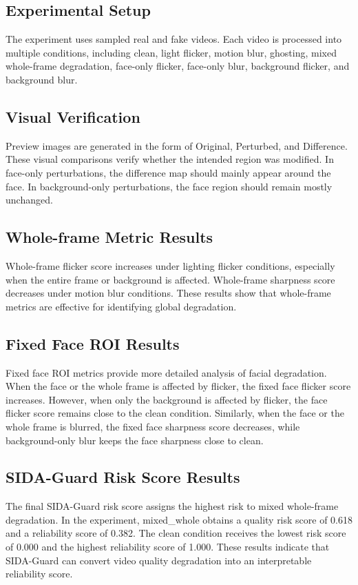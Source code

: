 \documentclass[conference]{IEEEtran}
\begin{document}
\subsection{Experimental Setup}
The experiment uses sampled real and fake videos. Each video is processed into multiple conditions, including clean, light flicker, motion blur, ghosting, mixed whole-frame degradation, face-only flicker, face-only blur, background flicker, and background blur.

\subsection{Visual Verification}
Preview images are generated in the form of Original, Perturbed, and Difference. These visual comparisons verify whether the intended region was modified. In face-only perturbations, the difference map should mainly appear around the face. In background-only perturbations, the face region should remain mostly unchanged.

\subsection{Whole-frame Metric Results}
Whole-frame flicker score increases under lighting flicker conditions, especially when the entire frame or background is affected. Whole-frame sharpness score decreases under motion blur conditions. These results show that whole-frame metrics are effective for identifying global degradation.

\subsection{Fixed Face ROI Results}
Fixed face ROI metrics provide more detailed analysis of facial degradation. When the face or the whole frame is affected by flicker, the fixed face flicker score increases. However, when only the background is affected by flicker, the face flicker score remains close to the clean condition. Similarly, when the face or the whole frame is blurred, the fixed face sharpness score decreases, while background-only blur keeps the face sharpness close to clean.

\subsection{SIDA-Guard Risk Score Results}
The final SIDA-Guard risk score assigns the highest risk to mixed whole-frame degradation. In the experiment, mixed\_whole obtains a quality risk score of 0.618 and a reliability score of 0.382. The clean condition receives the lowest risk score of 0.000 and the highest reliability score of 1.000. These results indicate that SIDA-Guard can convert video quality degradation into an interpretable reliability score.
\end{document}
